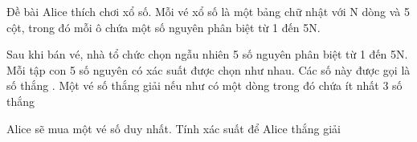 Đề bài  
Alice thích chơi xổ số. Mỗi vé xổ số là một bảng chữ nhật với N dòng và 5 cột, trong đó mỗi ô chứa một số nguyên phân biệt từ 1 đến 5N.  

   Sau khi bán vé, nhà tổ chức chọn ngẫu nhiên 5 số nguyên phân biệt từ 1 đến 5N. Mỗi tập con 5 số nguyên có xác suất được chọn như nhau. Các số này được gọi là   số thắng   . Một vé số thắng giải nếu như có một dòng trong đó chứa ít nhất 3   số thắng

   Alice sẽ mua một vé số duy nhất. Tính xác suất để Alice thắng giải